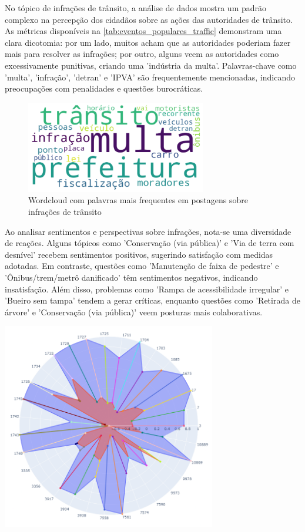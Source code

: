 No tópico de infrações de trânsito, a análise de dados mostra um padrão complexo na percepção dos cidadãos sobre as ações das autoridades de trânsito. As métricas disponíveis na \autoref{tab:eventos_populares_traffic} demonstram uma clara dicotomia: por um lado, muitos acham que as autoridades poderiam fazer mais para resolver as infrações; por outro, alguns veem as autoridades como excessivamente punitivas, criando uma 'indústria da multa'. Palavras-chave como 'multa', 'infração', 'detran' e 'IPVA' são frequentemente mencionadas, indicando preocupações com penalidades e questões burocráticas.

\begin{figure}[htb]
	\centering
	\includegraphics[width=0.7\textwidth]{images/wordcloud_traffic.png}
	\caption{Wordcloud com palavras mais frequentes em postagens sobre infrações de trânsito}
	\label{fig:wordcloud_traffic}
\end{figure}

Ao analisar sentimentos e perspectivas sobre infrações, nota-se uma diversidade de reações. Alguns tópicos como 'Conservação (via pública)' e 'Via de terra com desnível' recebem sentimentos positivos, sugerindo satisfação com medidas adotadas. Em contraste, questões como 'Manutenção de faixa de pedestre' e 'Ônibus/trem/metrô danificado' têm sentimentos negativos, indicando insatisfação. Além disso, problemas como 'Rampa de acessibilidade irregular' e 'Bueiro sem tampa' tendem a gerar críticas, enquanto questões como 'Retirada de árvore' e 'Conservação (via pública)' veem posturas mais colaborativas.

\begin{quadro}[htb]
	\centering
	\includegraphics[width=0.7\textwidth]{images/social_barometer_traffic.png}
	\caption{Gráfico de Radar ilustrando a pressão social em relação ao tópico de Infrações de Trânsito.}
	\label{fig:social_barometer_traffic}
\end{quadro}

